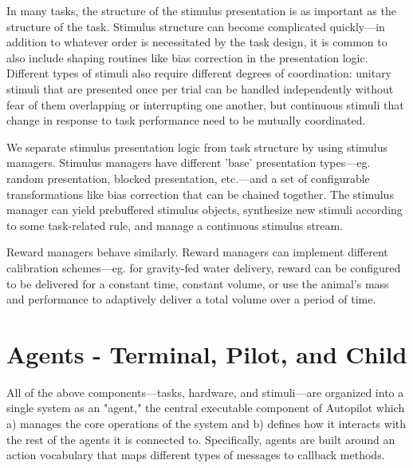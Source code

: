 In many tasks, the structure of the stimulus presentation is as important as the structure of the task. Stimulus structure can become complicated quickly---in addition to whatever order is necessitated by the task design, it is common to also include shaping routines like bias correction in the presentation logic. Different types of stimuli also require different degrees of coordination: unitary stimuli that are presented once per trial can be handled independently without fear of them overlapping  or interrupting one another, but continuous stimuli that change in response to task performance need to be mutually coordinated. 

We separate stimulus presentation logic from task structure by using stimulus managers. Stimulus managers have different 'base' presentation types---eg. random presentation, blocked presentation, etc.---and a set of configurable transformations like bias correction that can be chained together. The stimulus manager can yield prebuffered stimulus objects, synthesize new stimuli according to some task-related rule, and manage a continuous stimulus stream. 

Reward managers behave similarly. Reward managers can implement different calibration schemes---eg. for gravity-fed water delivery, reward can be configured to be delivered for a constant time, constant volume, or use the animal's mass and performance to adaptively deliver a total volume over a period of time.

\section{Agents - Terminal, Pilot, and Child}
\label{sec:agents}

All of the above components---tasks, hardware, and stimuli---are organized into a single system as an "agent," the central executable component of Autopilot which a) manages the core operations of the system and b) defines how it interacts with the rest of the agents it is connected to. Specifically, agents are built around an action vocabulary that  maps different types of messages to callback methods.

